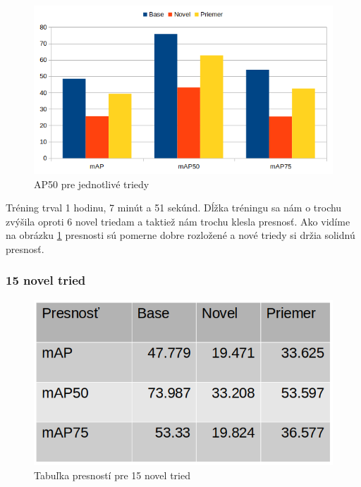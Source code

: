 \begin{figure}[H]
\centering
\includegraphics[width=\textwidth]{images/10novel_chart.png}
\caption{AP50 pre jednotlivé triedy}
\label{fig:image611}
\end{figure}

Tréning trval 1 hodinu, 7 minút a 51 sekúnd. Dĺžka tréningu sa nám o trochu zvýšila oproti 6 novel triedam a taktiež nám trochu klesla presnosť. Ako vidíme na obrázku \ref{fig:image611} presnosti sú pomerne dobre rozložené a nové triedy si držia solidnú presnosť. 

\subsubsection{15 novel tried}

\begin{figure}[H]
\centering
\includegraphics[width=\textwidth]{images/15novel_table.png}
\caption{Tabuľka presností pre 15 novel tried}
\label{fig:image62}
\end{figure}

